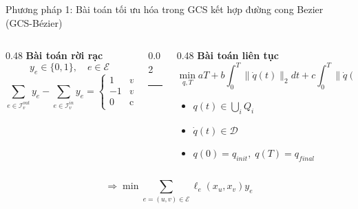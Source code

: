 \documentclass[aspectratio=169]{beamer}
\begin{document}
\begin{frame}{Phương pháp 1: Bài toán tối ưu hóa trong GCS kết hợp đường cong Bezier (GCS-Bézier)}

    \begin{columns}[T,onlytextwidth]
        \begin{column}{0.48\textwidth}
            \centering
            \textbf{Bài toán rời rạc}
            \[
                y_e \in \{0,1\},\quad e\in\mathcal E
            \]
            \[
                \sum_{e\in\mathcal I^{out}_v} y_e
                -
                \sum_{e\in\mathcal I^{in}_v} y_e
                =
                \begin{cases}
                    1  & v=\sigma       \\
                    -1 & v=\tau         \\
                    0  & \text{còn lại}
                \end{cases}
            \]
        \end{column}

        \begin{column}{0.02\textwidth}
            \centering
            \rule{0.4pt}{0.6\textheight}
        \end{column}

        \begin{column}{0.48\textwidth}
            \centering
            \textbf{Bài toán liên tục}
            \[
                \min_{q,T}
                aT
                + b\int_0^T \|\dot q(t)\|_2dt
                + c\int_0^T \|\dot q(t)\|_2^2dt
            \]
            \begin{itemize}
                \item $q(t)\in \bigcup_i Q_i$
                \item $\dot q(t)\in\mathcal D$
                \item $q(0)=q_{init},\;q(T)=q_{final}$
            \end{itemize}
        \end{column}
    \end{columns}

    \vspace{-0.2em}
    \[
        \Rightarrow
        \min \sum_{e=(u,v)\in\mathcal E}
        \ell_e(x_u,x_v)y_e
    \]

\end{frame}
\end{document}
